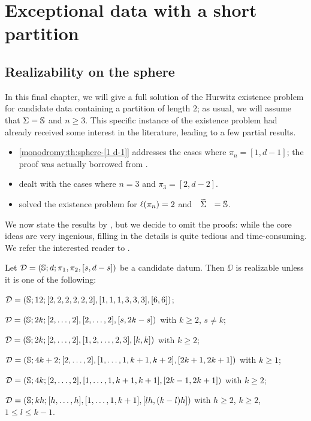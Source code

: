 \chapter{Exceptional data with a short partition}\label{short-partition:ch}
\smallvertices{}

\section{Realizability on the sphere}

In this final chapter, we will give a full solution of the Hurwitz existence problem for candidate data containing a partition of length $2$; as usual, we will assume that $\Sigma=\mathbb{S}{}$ and $n\ge 3$. This specific instance of the existence problem had already received some interest in the literature, leading to a few partial results.
\begin{itemize}
\item \cref{monodromy:th:sphere-[1 d-1]} addresses the cases where $\pi_n=[1,d-1]$; the proof was actually borrowed from .
\item \textcite{pervova-existence-ii} dealt with the cases where $n=3$ and $\pi_3=[2,d-2]$.
\item \textcite{pakovich} solved the existence problem for $\ell(\pi_n)=2$ and $\tSigma=\sphere{}$.
\end{itemize}
We now state the results by \citeauthor{pakovich}, but we decide to omit the proofs: while the core ideas are very ingenious, filling in the details is quite tedious and time-consuming. We refer the interested reader to \cite{pakovich}.

\begin{theorem}\label{short-partition:th:realizability-on-sphere-n-3}
Let $\mathcal{D}=(\mathbb{S}{};d;\pi_1,\pi_2,[s,d-s])$ be a candidate datum. Then $\DD$ is realizable unless it is one of the following:
\begin{enumarabic}
\item $\mathcal{D}=(\mathbb{S}{};12;[2,2,2,2,2,2],[1,1,1,3,3,3],[6,6])$;
\item $\mathcal{D}=(\mathbb{S}{};2k;[2,\ldots,2],[2,\ldots,2],[s,2k-s])$ with $k\ge 2$, $s\neq k$;
\item $\mathcal{D}=(\mathbb{S}{};2k;[2,\ldots,2],[1,2,\ldots,2,3],[k,k])$ with $k\ge2$;
\item $\mathcal{D}=(\mathbb{S}{};4k+2;[2,\ldots,2],[1,\ldots,1,k+1,k+2],[2k+1,2k+1])$ with $k\ge 1$;
\item $\mathcal{D}=(\mathbb{S}{};4k;[2,\ldots,2],[1,\ldots,1,k+1,k+1],[2k-1,2k+1])$ with $k\ge2$;
\item\label{short-partition:th:realizability-on-sphere-n-3:it:6} $\mathcal{D}=(\mathbb{S}{};kh;[h,\ldots,h],[1,\ldots,1,k+1],[lh,(k-l)h])$ with $h\ge 2$, $k\ge 2$, $1\le l\le k-1$.
\end{enumarabic}
\end{theorem}


